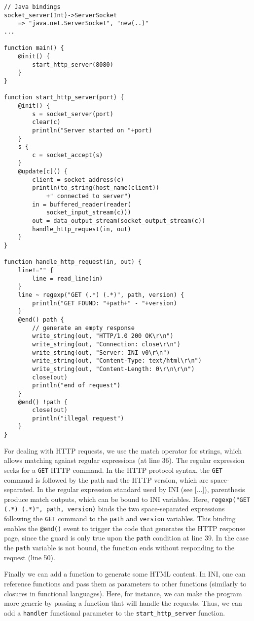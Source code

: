 \documentclass[11pt]{article}
\begin{document}
\begin{lstlisting}
// Java bindings
socket_server(Int)->ServerSocket
	=> "java.net.ServerSocket", "new(..)"
...
	
function main() {
	@init() {
		start_http_server(8080)
	}
}

function start_http_server(port) {
	@init() {
		s = socket_server(port)
		clear(c)
		println("Server started on "+port)
	}
	s {
		c = socket_accept(s)
	}
	@update[c]() {
		client = socket_address(c)
		println(to_string(host_name(client))
			+" connected to server")
		in = buffered_reader(reader(
			socket_input_stream(c)))
		out = data_output_stream(socket_output_stream(c))
		handle_http_request(in, out)
	}		
}

function handle_http_request(in, out) {
	line!="" {
		line = read_line(in)
	}
	line ~ regexp("GET (.*) (.*)", path, version) {
		println("GET FOUND: "+path+" - "+version)
	}
	@end() path {
		// generate an empty response
		write_string(out, "HTTP/1.0 200 OK\r\n")
		write_string(out, "Connection: close\r\n")
		write_string(out, "Server: INI v0\r\n")
		write_string(out, "Content-Type: text/html\r\n")
		write_string(out, "Content-Length: 0\r\n\r\n")
		close(out)
		println("end of request")
	}
	@end() !path {
		close(out)
		println("illegal request")
	}
}
\end{lstlisting}

For dealing with HTTP requests, we use the match operator for strings, which allows matching against regular expressions (at line 36). The regular expression seeks for a \texttt{GET} HTTP command. In the HTTP protocol syntax, the \texttt{GET} command is followed by the path and the HTTP version, which are space-separated. In the regular expression \cite{friedl2006} standard used by INI (see [...]), parenthesis produce match outputs, which can be bound to INI variables. Here, \texttt{regexp("GET (.*) (.*)", path, version)} binds the two space-separated expressions following the \texttt{GET} command to the \texttt{path} and \texttt{version} variables. This binding enables the \texttt{@end()} event to trigger the code that generates the HTTP response page, since the guard is only true upon the \texttt{path} condition at line 39. In the case the \texttt{path} variable is not bound, the function ends without responding to the request (line 50).

Finally we can add a function to generate some HTML content. In INI, one can reference functions and pass them as parameters to other functions (similarly to closures in functional languages). Here, for instance, we can make the program more generic by passing a function that will handle the requests. Thus, we can add a \texttt{handler} functional parameter to the \texttt{start\_http\_server} function.
\end{document}
